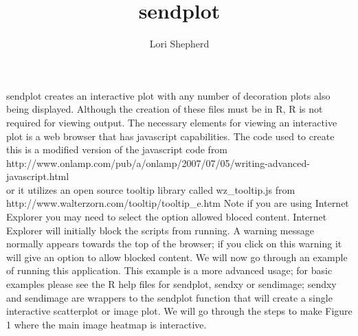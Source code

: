 \documentclass[]{article}
\title{sendplot}
\author{Lori Shepherd}
\begin{document}
\maketitle

\quad sendplot creates an interactive plot with any number of decoration plots also being displayed. Although the creation of these files must be in R, R is not required for viewing output. The necessary elements for viewing an interactive plot is a web browser that has javascript capabilities. The code used to create this is a modified version of the javascript code from \\
http://www.onlamp.com/pub/a/onlamp/2007/07/05/writing-advanced-javascript.html \\
or it utilizes an open source tooltip library called wz\_tooltip.js from \\
 http://www.walterzorn.com/tooltip/tooltip\_e.htm
Note if you are using Internet Explorer you may need to select the option allowed bloced content. Internet Explorer will initially block the scripts from running. A warning message normally appears towards the top of the browser; if you click on this warning it will give an option to allow blocked content. 
\quad We will now go through an example of running this application. This example is a more advanced usage; for basic examples please see the R help files for sendplot, sendxy or sendimage; sendxy and sendimage are wrappers to the sendplot function that will create a single interactive scatterplot or image plot. We will go through the steps to make Figure 1 where the main image heatmap is interactive.
\end{document}
